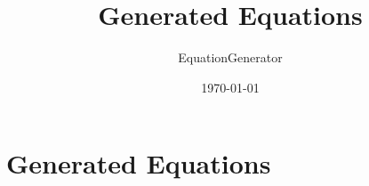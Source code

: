 \documentclass{article}
\begin{document}
\title{Generated Equations}
\author{EquationGenerator}
\date{\today}
\maketitle

\section*{Generated Equations}


\end{document}
